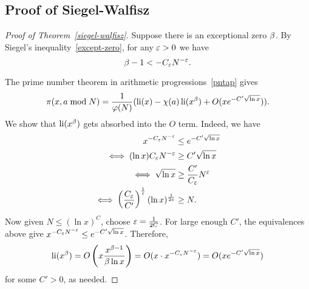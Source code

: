 \subsection{Proof of Siegel-Walfisz}
\begin{proof}[Proof of Theorem~\ref{siegel-walfisz}]
Suppose there is an exceptional zero $\beta$. By Siegel's inequality~\ref{except-zero}, for any $\varepsilon>0$ we have
\[
\beta-1< -C_{\varepsilon}N^{-\varepsilon}.
\]

The prime number theorem in arithmetic progressions~\ref{pntap} gives
\[
\pi(x,a\bmod N)=
\frac{1}{\varphi(N)}(\operatorname{li}(x)-\chi(a)\operatorname{li}(x^{\beta})+O(xe^{-C'\sqrt{\ln x}})).
\]
We show that $\operatorname{li}(x^{\beta})$ gets absorbed into the $O$ term. Indeed, we have
\begin{align*}
x^{-C_{\varepsilon}N^{-\varepsilon}}&\le e^{-C'\sqrt{\ln x}}\\
\iff (\ln x)C_{\varepsilon}N^{-\varepsilon} & \ge C'\sqrt{\ln x}\\
\iff \sqrt{\ln x} & \ge \frac{C'}{C_{\varepsilon}}N^{\varepsilon}\\
\iff \left( {\frac{C_{\varepsilon}}{C'}} \right)^{\frac{1}{\varepsilon}}(\ln x)^{\frac{1}{2\varepsilon}}& \ge N.
\end{align*}
Now given $N\le (\ln x)^C$, choose $\varepsilon=\frac{1}{2C}$. For large enough $C'$, the equivalences above give $x^{-C_{\varepsilon}N^{-\varepsilon}}\le e^{-C'\sqrt{\ln x}}$. Therefore, 
\[
\operatorname{li}(x^{\beta})=O\left( {x\frac{x^{\beta-1}}{\beta \ln x}} \right)=O(x\cdot x^{-C_{\varepsilon}N^{-\varepsilon}})=O(xe^{-C'\sqrt{\ln x}})
\]
for some $C'>0$, as needed.
\end{proof}